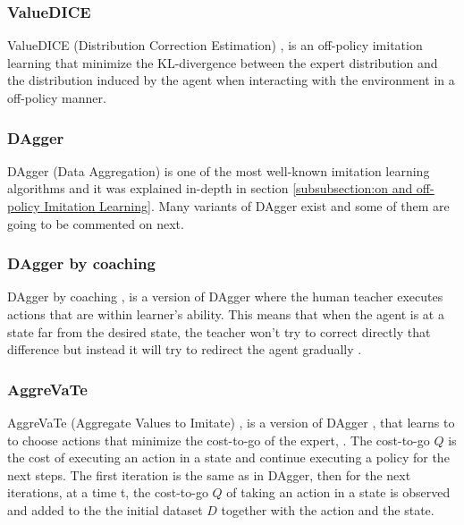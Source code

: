 \subsubsection*{ValueDICE}
ValueDICE (Distribution Correction Estimation) \cite{ValueDICE-Kostrikov:2019}, is an off-policy imitation learning \cite{Laskey:phdthesis} that minimize the KL-divergence between the expert distribution and the distribution induced by the agent when interacting with the environment in a off-policy manner.


\subsubsection*{DAgger}
DAgger (Data Aggregation) \cite{DAgger-Ross:2011} is one of the most well-known imitation learning algorithms and it was explained in-depth in section \ref{subsubsection:on and off-policy Imitation Learning}. Many variants of DAgger exist and some of them are going to be commented on next.



\subsubsection*{DAgger by coaching}
DAgger by coaching \cite{DAgger-by-coaching-He-DaumeIII-Eisner:2012},  is a version of DAgger \cite{DAgger-Ross:2011} where the human teacher executes actions that are within learner’s ability. This means that when the agent is at a state far from the desired state, the teacher won't try to correct directly that difference but instead it will try to redirect the agent gradually \cite{Global-overview-Attia:2018}.


\subsubsection*{AggreVaTe}
AggreVaTe (Aggregate Values to Imitate) \cite{AggreVaTe-Ross-Bagnell:2014}, is a version of DAgger \cite{DAgger-Ross:2011}, that learns to to choose actions that minimize the cost-to-go of the expert, 
\cite{Global-overview-Attia:2018}. The cost-to-go $Q$ is the cost of executing an action in a state and continue executing a policy for the next steps. The first iteration is the same as in DAgger, then for the next iterations,  at a time t, the cost-to-go $Q$ of taking an action in a state is observed and added to the the initial dataset $D$ together with the action and the state.



